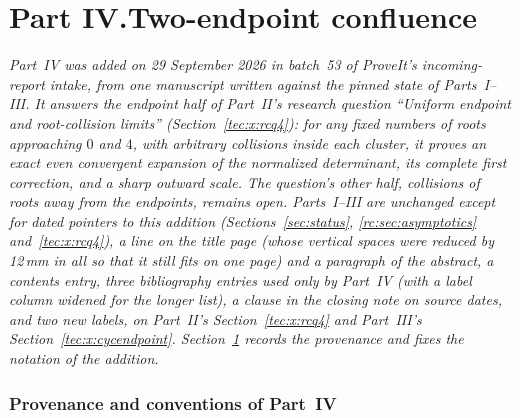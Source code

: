\documentclass[11pt,a4paper]{article}
\numberwithin{equation}{section}
\theoremstyle{definition}
\theoremstyle{remark}
\begin{document}
\clearpage
{}\part*{Part IV.\quad Two-endpoint confluence}

\noindent\emph{Part~IV was added on 29 September 2026 in batch~53 of
ProveIt's incoming-report intake, from one manuscript written against the
pinned state of Parts~I--III.  It answers the endpoint half of Part~II's
research question ``Uniform endpoint and root-collision limits''
(Section~\ref{tec:x:rcq4}): for any fixed numbers of roots approaching
$0$ and $4$, with arbitrary collisions inside each cluster, it proves an
exact even convergent expansion of the normalized determinant, its
complete first correction, and a sharp outward scale.  The question's
other half, collisions of roots away from the endpoints, remains open.
Parts~I--III are unchanged except for dated pointers to this addition
(Sections~\ref{sec:status}, \ref{rc:sec:asymptotics}
and~\ref{tec:x:rcq4}), a line on the title page (whose vertical spaces
were reduced by 12\,mm in all so that it still fits on one page) and a
paragraph of the abstract, a contents entry, three bibliography entries used only by
Part~IV (with a label column widened for the longer list), a clause in
the closing note on source dates, and two new labels, on Part~II's
Section~\ref{tec:x:rcq4} and Part~III's Section~\ref{tec:x:cycendpoint}.
Section~\ref{tec:sec:intro} records the provenance and fixes the notation
of the addition.}


\section{Provenance and conventions of Part~IV}\label{tec:sec:intro}
\end{document}
